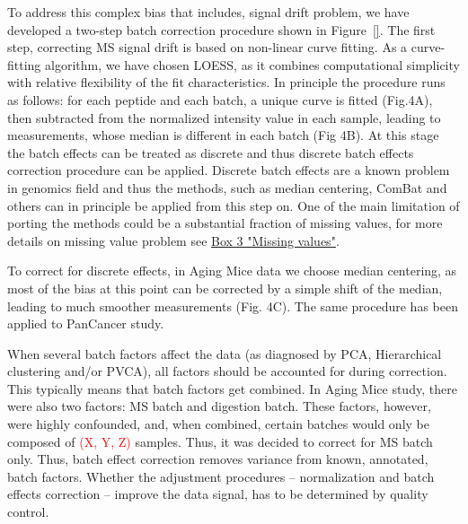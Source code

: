 \documentclass[num-refs]{wiley-article}
\begin{document}
To address this complex bias that includes, signal drift problem, we have developed a two-step batch correction procedure shown in Figure~\ref{}.
The first step, correcting MS signal drift is based on non-linear curve fitting. As a curve-fitting algorithm, we have chosen LOESS, as it combines computational simplicity with relative flexibility of the fit characteristics. In principle the procedure runs as follows: for each peptide and each batch, a unique curve is fitted (Fig.4A), then subtracted from the normalized intensity value in each sample, leading to measurements, whose median is different in each batch (Fig 4B). At this stage the batch effects can be treated as discrete and thus discrete batch effects correction procedure can be applied. Discrete batch effects are a known problem in genomics field and thus the methods, such as median centering, ComBat and others can in principle be applied from this step on. One of the main limitation of porting the methods could be a substantial fraction of missing values, for more details on missing value problem see \hyperref[box:Box3_missingness]{Box 3 "Missing values"}.

To correct for discrete effects, in Aging Mice data we choose median centering, as most of the bias at this point can be corrected by a simple shift of the median, leading to much smoother measurements (Fig. 4C). The same procedure has been applied to PanCancer study. 

When several batch factors affect the data (as diagnosed by PCA, Hierarchical clustering and/or PVCA), all factors should be accounted for during correction. This typically means that batch factors get combined. In Aging Mice study, there were also two factors: MS batch and digestion batch. These factors, however, were highly confounded, and, when combined, certain batches would only be composed of \textcolor{red}{(X, Y, Z)} samples. Thus, it was decided to correct for MS batch only.
Thus, batch effect correction removes variance from known, annotated, batch factors. Whether the adjustment procedures – normalization and batch effects correction – improve the data signal, has to be determined by quality control.
\end{document}
